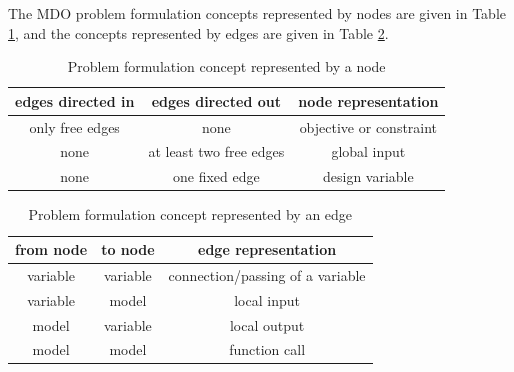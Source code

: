 The MDO problem formulation concepts represented by nodes are given in 
Table \ref{t:node representation}, and the concepts represented by edges are 
given in Table \ref{t:edge representation}.
\begin{table}[h!]
 \begin{center}
  \caption{Problem formulation concept represented by a node}
  \label{t:node representation}
  \begin{tabular}{ccc} \hline 
edges directed in & edges directed out & node representation \\ \hline
only free edges & none & objective or constraint\\
none & at least two free edges & global input \\
none & one fixed edge & design variable \\ \hline
  \end{tabular}
 \end{center}
 \vspace{-15pt}
\end{table}
\begin{table}[h!]
 \begin{center}
  \caption{Problem formulation concept represented by an edge}
  \label{t:edge representation}
  \begin{tabular}{ccc} \hline 
from node & to node & edge representation \\ \hline
variable & variable & connection/passing of a variable\\
variable & model & local input \\
model & variable & local output \\
model & model & function call \\ \hline
  \end{tabular}
 \end{center}
 \vspace{-15pt}
\end{table}

